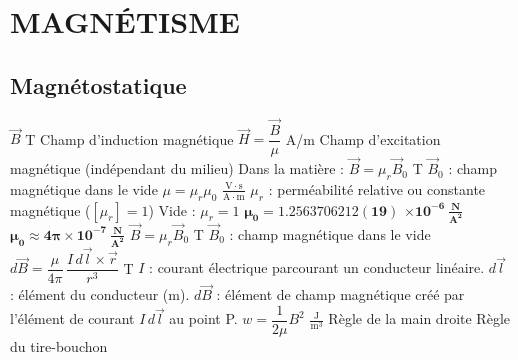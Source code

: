 \section{MAGNÉTISME}

\subsection{Magnétostatique}
\begin{formules}
    {$\vec B$}
    {T}
    {Champ d'induction magnétique}
    {$\vec H = \dfrac{\vec B}{\mu}$}
    {A/m}
    {Champ d'excitation magnétique (indépendant du milieu)}
    {Dans la matière : \newline $\vec B = \mu_r\vec B_0$}
    {T}
    {$\vec B_0$ : champ magnétique dans le vide}
    {$\mu = \mu_r\mu_0$}
    {$\frac{\mathrm{V\cdot s}}{\mathrm{A\cdot m}}$}
    {$\mu_r$ : perméabilité relative \textcolor{brunmu}{ou constante magnétique} ($[\mu_r] = 1$) \newline
     Vide : $\mu_r = 1$ \newline
     \textcolor{bleumu}{$\boldsymbol{\mu_0 = 1.2563706212(19)}$ \newline
     \hspace*{\fill}$\boldsymbol{\times10^{-6}\ \frac{N}{A^2}}$} \newline
     \hspace*{\fill}\textcolor{bleumu}{$\boldsymbol{\mu_0 \approx 4\pi\times10^{-7}\ \frac{N}{A^2}}$}}
    {$\vec B = \mu_r\vec B_0$}
    {T}
    {$\vec B_0$ : champ magnétique dans le vide}
    {$d\vec B = \dfrac{\mu}{4\pi}\,\dfrac{I\,d\vec l\times\vec r}{r^3}$}
    {T}
    {$I$ : courant électrique parcourant un conducteur linéaire.
     $d\vec l$ : élément du conducteur (m). \newline
     $d\vec B$ : élément de champ magnétique créé par l'élément de courant $I\,d\vec l$ au point P.}
    {$w = \dfrac{1}{2\mu}B^2$}
    {$\frac{\mathrm{J}}{\mathrm{m^3}}$}
    {}
    {Règle de la main droite }
    {}
    {Règle du tire-bouchon }
\end{formules}

